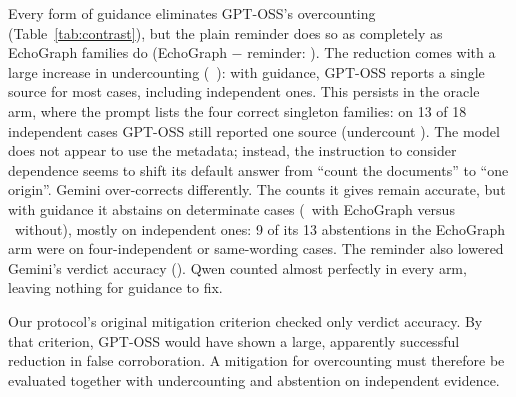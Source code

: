 \documentclass[11pt]{article}
\begin{document}
Every form of guidance eliminates GPT-OSS's overcounting (Table~\ref{tab:contrast}), but the plain
reminder does so as completely as EchoGraph families do (EchoGraph $-$ reminder:
\DevGptossEchoRemFcr). The reduction comes with a large increase in undercounting
(\DevGptossEchoStdUnder\ \DevGptossEchoStdUnderCI): with guidance, GPT-OSS reports a single source
for most cases, including independent ones. This persists in the oracle arm, where the prompt lists
the four correct singleton families: on 13 of 18 independent cases GPT-OSS still reported one
source (undercount \DevGptossOracleUnder). The model does not appear to use the metadata; instead,
the instruction to consider dependence seems to shift its default answer from ``count the
documents'' to ``one origin''. Gemini over-corrects differently. The counts it gives remain
accurate, but with guidance it abstains on determinate cases (\DevGeminiEchographDetAbst\ with
EchoGraph versus \DevGeminiStandardDetAbst\ without), mostly on independent ones: 9 of its 13
abstentions in the EchoGraph arm were on four-independent or same-wording cases. The reminder also lowered Gemini's verdict accuracy
(\DevGeminiRemStdAcc). Qwen counted almost perfectly in every arm, leaving nothing for guidance to
fix.

Our protocol's original mitigation criterion checked only verdict accuracy. By that criterion,
GPT-OSS would have shown a large, apparently successful reduction in false corroboration. A
mitigation for overcounting must therefore be evaluated together with undercounting and abstention
on independent evidence.
\end{document}
